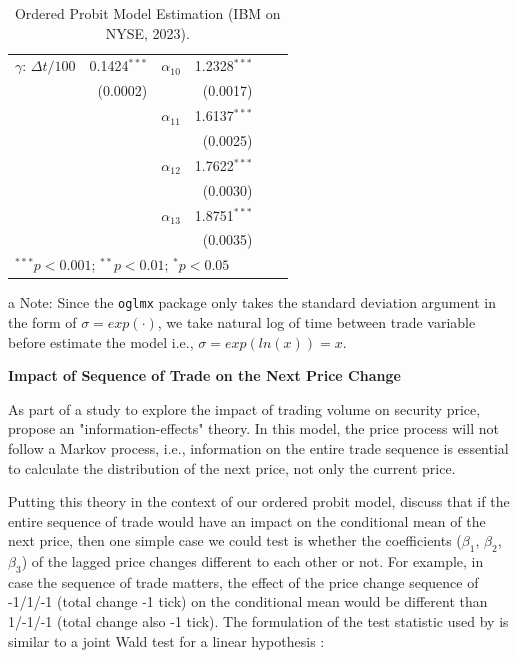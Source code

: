 \begin{table}[H]
\begin{center}
{\begin{threeparttable}
\begin{tabular}{lrlrlr}
$\gamma$: \(\Delta t/100\) \tnote{a}& 0.1424$^{***}$ & $\alpha_{10}$ & 1.2328$^{***}$ & & \\
 & (0.0002) & & (0.0017) & & \\
 
 & & $\alpha_{11}$ & 1.6137$^{***}$ & & \\
 & & & (0.0025) & & \\
 
 & & $\alpha_{12}$ & 1.7622$^{***}$ & & \\
 & & & (0.0030) & & \\
 
 & & $\alpha_{13}$ & 1.8751$^{***}$ & & \\
 & & & (0.0035) & & \\
\bottomrule
\multicolumn{6}{l}{\scriptsize{$^{***}p<0.001$; $^{**}p<0.01$; $^{*}p<0.05$}}
\end{tabular}

\begin{tablenotes}
    \small
    \item[a] Note: Since the \texttt{oglmx} package \citep{oglmx} only takes the standard deviation argument in the form of \(\sigma=exp(\cdot)\), we take natural log of time between trade variable before estimate the model i.e., \(\sigma=exp(ln(x)) = x\).
  \end{tablenotes}


\end{threeparttable}}
\caption{Ordered Probit Model Estimation (IBM on NYSE, 2023).}
\label{tab:table-7}
\end{center}
\end{table}



{\noindent\bfseries Impact of Sequence of Trade on the Next Price Change}

As part of a study to explore the impact of trading volume on security price, \citet{easleyohara1987} propose an "information-effects" theory. In this model, the price process will not follow a Markov process, i.e., information on the entire trade sequence is essential to calculate the distribution of the next price, not only the current price. 

Putting this theory in the context of our ordered probit model, \citet{hausman1992} discuss that if the entire sequence of trade would have an impact on the conditional mean of the next price, then one simple case we could test is whether the coefficients ($\beta_1$, $\beta_2$, $\beta_3$) of the lagged price changes different to each other or not. For example, in case the sequence of trade matters, the effect of the price change sequence of -1/1/-1 (total change -1 tick) on the conditional mean would be different than 1/-1/-1 (total change also -1 tick). The formulation of the test statistic used by \citet{hausman1992} is similar to a joint Wald test for a linear hypothesis \citep{wooldridge2010}:

